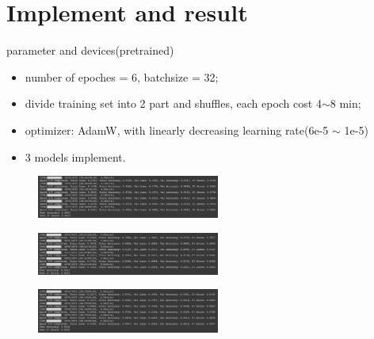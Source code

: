 \documentclass{beamer}
\begin{document}
\section{Implement and result}
\begin{frame}{parameter and devices(pretrained)}
  \begin{itemize}
    \item number of epoches = 6, batchsize = 32;
    \item divide training set into 2 part and shuffles, each epoch cost 4$\sim$8 min;
    \item optimizer: AdamW, with linearly decreasing learning rate(6e-5 $\sim$ 1e-5)
    \item 3 models implement.
  \end{itemize}
    \begin{figure}[H]
      \centering
      \includegraphics[width=6cm]{pictures/bertrun.png}
    \end{figure}
    \begin{figure}[H]
      \centering
      \includegraphics[width=6cm]{pictures/albertrun.png}
    \end{figure}
    \begin{figure}[H]
      \centering
      \includegraphics[width=6cm]{pictures/debertarun.png}
    \end{figure}
\end{frame}
\end{document}
